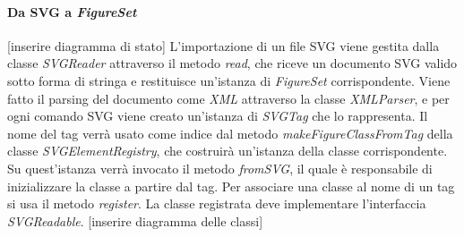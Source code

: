 \paragraph{Da SVG a \textit{FigureSet}}
[inserire diagramma di stato]
L'importazione di un file SVG viene gestita dalla classe \textit{SVGReader} attraverso il metodo \textit{read}, che riceve un documento SVG valido sotto forma di stringa e restituisce un'istanza di \textit{FigureSet} corrispondente. Viene fatto il parsing del documento come \textit{XML} attraverso la classe \textit{XMLParser}, e per ogni comando SVG viene creato un'istanza di \textit{SVGTag} che lo rappresenta. Il nome del tag verr\`a usato come indice dal metodo \textit{makeFigureClassFromTag} della classe \textit{SVGElementRegistry}, che costruir\`a un'istanza della classe corrispondente. Su quest'istanza verr\`a invocato il metodo \textit{fromSVG}, il quale \`e responsabile di inizializzare la classe a partire dal tag. Per associare una classe al nome di un tag si usa il metodo \textit{register}. La classe registrata deve implementare l'interfaccia \textit{SVGReadable}.
[inserire diagramma delle classi] \\
